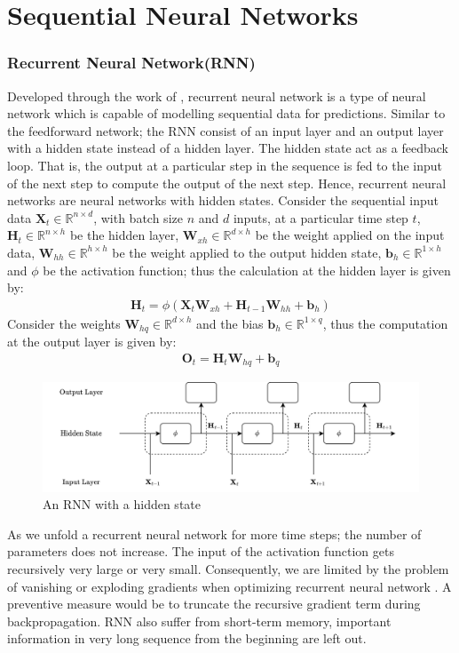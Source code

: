 \section{Sequential Neural Networks}
\subsubsection*{Recurrent Neural Network(RNN)}
Developed through the work of \cite{Rumelhart:1986aa}, recurrent neural network is a type of neural network which is capable of modelling sequential data for predictions. Similar to the feedforward network; the RNN consist of an input layer and  an output layer with a hidden state instead of a hidden layer. The hidden state act as a feedback loop. That is, the output at a particular step in the sequence is fed to the input of the next step to compute the output of the next step. Hence, recurrent neural networks are neural networks with hidden states. Consider the sequential input data $\mathbf{X}_t \in \mathbb{R}^{n \times d}$, with batch size $n$ and $d$ inputs, at a particular time step $t$, $\mathbf{H}_t \in \mathbb{R}^{n \times h}$ be the hidden layer, $\mathbf{W}_{xh}\in \mathbb{R}^{d \times h}$  be the weight applied on the input data, $\mathbf{W}_{hh}\in \mathbb{R}^{h \times h}$ be the weight applied to the output hidden state, $\mathbf{b}_h \in \mathbb{R}^{1 \times h}$ and $\phi$ be the activation function; thus the calculation at the hidden layer is given by:
\begin{align}
  \label{eq:RNN_HL}
  \mathbf{H}_t = \phi(\mathbf{X}_t \mathbf{W}_{xh} + \mathbf{H}_{t-1}\mathbf{W}_{hh} + \mathbf{b}_h)
\end{align}
Consider the weights $\mathbf{W}_{hq} \in \mathbb{R}^{d \times h}$ and the bias $\mathbf{b}_h \in \mathbb{R}^{1 \times q}$, thus the computation at the output layer is given by:
\begin{align}
  \label{eq:RNN_OL}
  \mathbf{O}_t = \mathbf{H}_t \mathbf{W}_{hq} + \mathbf{b}_q
\end{align}
\begin{figure}[H]
  \centering
  \includegraphics[scale=0.8]{CHAPTER_2/c2_fig_RNN_draw.png}
  \caption{An RNN with a hidden state}
  \label{}
\end{figure}
\noindent As we unfold a recurrent neural network for more time steps; the number of parameters does not increase. The input of the activation function gets recursively very large or very small. Consequently, we are limited by the problem of vanishing or exploding gradients when optimizing recurrent neural network \cite{Bengio1994} \cite{Kolen2001}. A preventive measure would be to truncate the recursive gradient term during backpropagation. RNN also suffer from short-term memory, important information in very long sequence from the beginning are left out.
